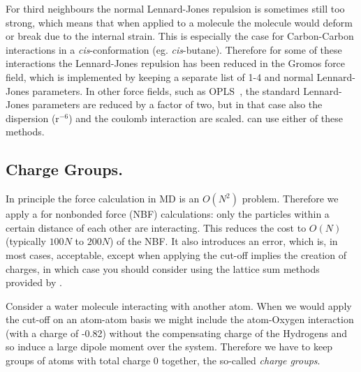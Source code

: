 For third neighbours the normal Lennard-Jones repulsion is sometimes
still too strong, which means that when applied to a molecule the
molecule would deform or break due to the internal strain. This is
especially the case for Carbon-Carbon interactions in a {\em
cis}-conformation (eg. {\em cis}-butane).  Therefore for some of these
interactions the Lennard-Jones repulsion has been reduced in the
Gromos force field, which is implemented by keeping a separate list of
1-4 and normal Lennard-Jones parameters. In other force fields, such
as OPLS~\cite{Jorgensen88}, the standard Lennard-Jones parameters are reduced
by a factor of two, but in that case also the dispersion (r$^{-6}$)
and the coulomb interaction are scaled.
{\gromacs} can use either of these methods.

\subsection{Charge Groups.}
\label{sec:cg}
In principle the force calculation in MD is an $O(N^2)$ problem. 
Therefore we apply a  
for nonbonded force (NBF) calculations:
only the particles within a certain distance of each other
are interacting. This reduces the cost to $O(N)$ (typically
$100N$ to $200N$) of the NBF. It also introduces an error,
which is, in most cases, acceptable, except when applying the cut-off
implies the creation of charges, in which case you should consider 
using the lattice sum methods provided by {\gromacs}.

Consider a water molecule interacting with another atom. When we would apply
the cut-off on an atom-atom basis we might include the atom-Oxygen
interaction (with a charge of -0.82) without the compensating charge
of the Hydrogens and so induce a large dipole moment over the system.
Therefore we have to keep groups of atoms with total charge
0 together, the so-called {\em charge groups}.



\newcommand{\Fi}{\ve{F}_i'}
\newcommand{\Fj}{\ve{F}_j'}
\newcommand{\Fk}{\ve{F}_k'}
\newcommand{\Fl}{\ve{F}_l'}
\newcommand{\Fdum}{\ve{F}_{d}}
\newcommand{\rvik}{\ve{r}_{ik}}
\newcommand{\rvid}{\ve{r}_{id}}
\newcommand{\rvjk}{\ve{r}_{jk}}
\newcommand{\rvjl}{\ve{r}_{jl}}


